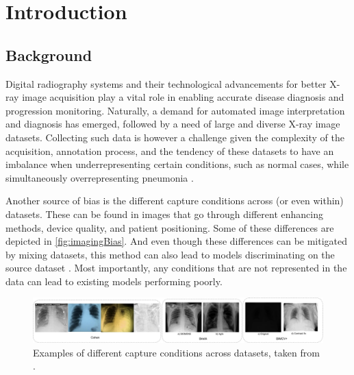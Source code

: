 \documentclass[nomenclature, english, bibtex]{kththesis}
\numberwithin{listing}{chapter}
\begin{document}
\ifnomenclature
    \cleardoublepage
    \printnomenclature
\fi

\label{pg:lastPageofPreface}
\mainmatter
\glsresetall
\renewcommand{\chaptermark}[1]{\markboth{#1}{}}
\chapter{Introduction}

\section{Background}


Digital radiography systems and their technological advancements for better X-ray image acquisition play a vital role in
enabling accurate disease diagnosis and progression monitoring. Naturally, a demand for automated image interpretation
and diagnosis has emerged, followed by a need of large and diverse X-ray image datasets. Collecting
such data is however a challenge given the complexity of the acquisition, annotation process,
and the tendency of these datasets to have an imbalance when underrepresenting certain conditions, such as normal cases,
while simultaneously overrepresenting pneumonia \cite{ansariMitigatingRiskMedical2025}.

Another source of bias is the different capture conditions across (or even within) datasets. These can be found
in images that go through different enhancing methods, device quality, and patient positioning. Some of these
differences are depicted in \autoref{fig:imagingBias}. And even though these differences can be mitigated by
mixing datasets, this method can also lead to models discriminating on the source dataset \cite{arias-garzonBiasesAssociatedDatabase2023}.
Most importantly, any conditions that are not represented in the data can lead to existing models performing poorly.

\begin{figure}
    \centering
    \includegraphics[width=\textwidth]{figures/imaging_bias.jpeg}
    \caption{Examples of different capture conditions across datasets, taken from \cite[Figure~6]{arias-garzonBiasesAssociatedDatabase2023}.}
    \label{fig:imagingBias}
\end{figure}
\end{document}
